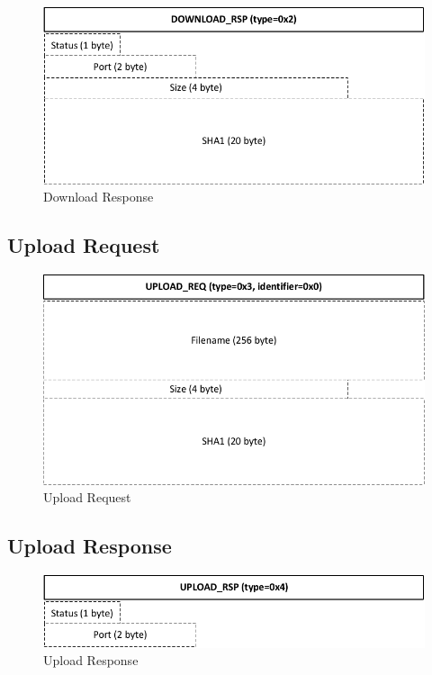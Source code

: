 \documentclass[]{article}
\begin{document}
\begin{figure}[H]
\centering
\includegraphics[width=\textwidth]{frames/download-rsp.pdf}
\caption{Download Response}
\label{DOWNLOAD-RSP}
\end{figure}

\subsection{Upload Request}

\begin{figure}[H]
\centering
\includegraphics[width=\textwidth]{frames/upload-req.pdf}
\caption{Upload Request}
\label{UPLOAD-REQ}
\end{figure}

\subsection{Upload Response}

\begin{figure}[H]
\centering
\includegraphics[width=\textwidth]{frames/upload-rsp.pdf}
\caption{Upload Response}
\label{UPLOAD-RSP}
\end{figure}
\end{document}
